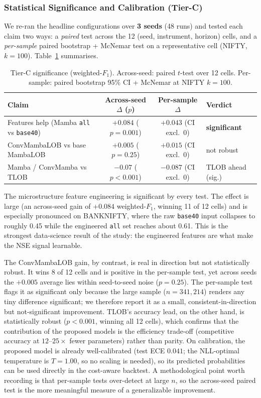 \documentclass[11pt]{article}
\begin{document}
\subsubsection{Statistical Significance and Calibration (Tier-C)}
We re-ran the headline configurations over \textbf{3 seeds} (48 runs) and tested each claim two ways: a
\emph{paired} test across the 12 (seed, instrument, horizon) cells, and a \emph{per-sample} paired bootstrap
+ McNemar test on a representative cell (NIFTY, $k{=}100$). Table~\ref{tab:tierc-sig} summarises.
\begin{table}[h]
\centering
\caption{Tier-C significance (weighted-$F_1$). Across-seed: paired $t$-test over 12 cells. Per-sample:
paired bootstrap 95\% CI + McNemar at NIFTY $k{=}100$.}
\label{tab:tierc-sig}
\begin{tabular}{@{}lccl@{}}
\toprule
Claim & Across-seed $\Delta$ ($p$) & Per-sample $\Delta$ & Verdict \\
\midrule
Features help (Mamba \texttt{all} vs \texttt{base40}) & $+0.084$ ($p{=}0.001$) & $+0.043$ (CI excl.\ 0) & \textbf{significant} \\
ConvMambaLOB vs base MambaLOB & $+0.005$ ($p{=}0.25$) & $+0.015$ (CI excl.\ 0) & not robust \\
Mamba / ConvMamba vs TLOB & $-0.07$ ($p{<}0.001$) & $-0.087$ (CI excl.\ 0) & TLOB ahead (sig.) \\
\bottomrule
\end{tabular}
\end{table}

The microstructure feature engineering is significant by every test. The effect is large (an across-seed gain
of $+0.084$ weighted-$F_1$, winning 11 of 12 cells) and is especially pronounced on BANKNIFTY, where the raw
\texttt{base40} input collapses to roughly 0.45 while the engineered \texttt{all} set reaches about 0.61. This
is the strongest data-science result of the study: the engineered features are what make the NSE signal
learnable.

The ConvMambaLOB gain, by contrast, is real in direction but not statistically robust. It wins 8 of 12 cells
and is positive in the per-sample test, yet across seeds the $+0.005$ average lies within seed-to-seed noise
($p=0.25$). The per-sample test flags it as significant only because the large sample ($n=341{,}214$) renders
any tiny difference significant; we therefore report it as a small, consistent-in-direction but
not-significant improvement. TLOB's accuracy lead, on the other hand, is statistically robust ($p<0.001$,
winning all 12 cells), which confirms that the contribution of the proposed models is the efficiency
trade-off (competitive accuracy at $12$--$25\times$ fewer parameters) rather than parity. On calibration, the
proposed model is already well-calibrated (test ECE $0.041$; the NLL-optimal temperature is $T=1.00$, so no
scaling is needed), so its predicted probabilities can be used directly in the cost-aware backtest. A
methodological point worth recording is that per-sample tests over-detect at large $n$, so the across-seed
paired test is the more meaningful measure of a generalizable improvement.
\end{document}

